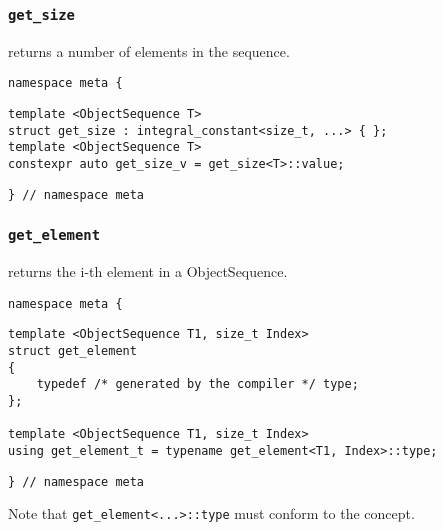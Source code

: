

\subsubsection{\texttt{get\_size}}

returns a number of elements in the sequence.

\begin{verbatim}
namespace meta {
\end{verbatim}
\begin{verbatim}
template <ObjectSequence T>
struct get_size : integral_constant<size_t, ...> { };
template <ObjectSequence T>
constexpr auto get_size_v = get_size<T>::value;
\end{verbatim}
\begin{verbatim}
} // namespace meta
\end{verbatim}



\subsubsection{\texttt{get\_element}}

returns the i-th element in a ObjectSequence.

\begin{verbatim}
namespace meta {
\end{verbatim}
\begin{verbatim}
template <ObjectSequence T1, size_t Index>
struct get_element
{
	typedef /* generated by the compiler */ type;
};
	
template <ObjectSequence T1, size_t Index>
using get_element_t = typename get_element<T1, Index>::type;

\end{verbatim}
\begin{verbatim}
} // namespace meta
\end{verbatim}


Note that \texttt{get\_element<...>::type}
must conform to the  concept.
